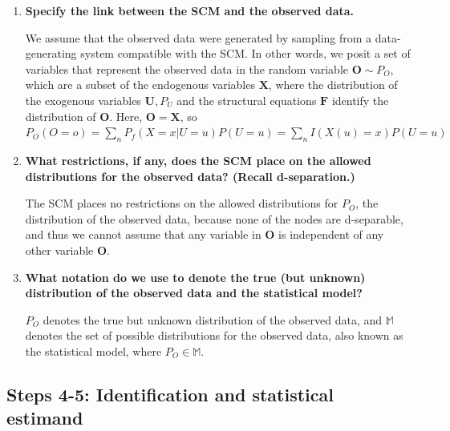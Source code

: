 \documentclass{article}\usepackage[]{graphicx}\usepackage[]{xcolor}
\begin{document}
  \begin{enumerate}[label=\textbf{\alph*.}]
  
    \item \textbf{Specify the link between the SCM and the observed data.}
    
    We assume that the observed data were generated by sampling from a data-generating system compatible with the SCM. In other words, we posit a set of variables that represent the observed data in the random variable $\bm{O} \sim P_O$, which are a subset of the endogenous variables $\bm{X}$, where the distribution of the exogenous variables $\bm{U}, P_U$ and the structural equations $\bm{F}$ identify the distribution of $\bm{O}$. Here, $\bm{O} = \bm{X}$, so $P_O(O = o) = \sum_{n} P_f(X = x | U = u)P(U = u) = 
    \sum_{n} I(X(u) = x)P(U = u)$
    
    \item \textbf{What restrictions, if any, does the SCM place on the allowed distributions for the observed data? (Recall d-separation.)}
    
    The SCM places no restrictions on the allowed distributions for $P_O$, the distribution of the observed data, because none of the nodes are d-separable, and thus we cannot assume that any variable in $\bm{O}$ is independent of any other variable $\bm{O}$.
    
    \item \textbf{What notation do we use to denote the true (but unknown) distribution of the observed data and the statistical model?}
    
    $P_O$ denotes the true but unknown distribution of the observed data, and $\mathbb{M}$ denotes the set of possible distributions for the observed data, also known as the statistical model, where $P_O \in \mathbb{M}$.
  
  \end{enumerate}
  
  \subsection{Steps 4-5: Identification and statistical estimand}
  
\end{document}
